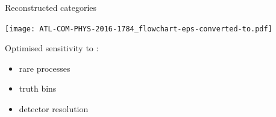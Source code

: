\begin{frame}{Reconstructed categories}
  \begin{minipage}{0.49\linewidth}
      \texttt{[image: ATL-COM-PHYS-2016-1784\_flowchart-eps-converted-to.pdf]}
  \end{minipage}
  \hfill
  \begin{minipage}{0.49\linewidth}
    Optimised sensitivity to :
    \begin{itemize}
    \item rare processes
    \item truth bins
    \item detector resolution
    \end{itemize}
  \end{minipage}
\end{frame}

